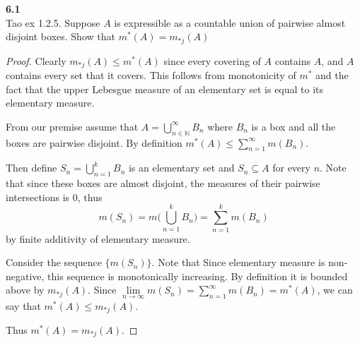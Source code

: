 \documentclass[12pt]{article}
\newcommand{\problem}[1]{\hspace{-4 ex} \large \textbf{#1}\\}
\begin{document}
\problem{6.1}Tao ex 1.2.5. Suppose $A$ is expressible as a countable union of pairwise almost disjoint boxes. Show that $m^*(A)=m_{*j}(A)$ 
	\begin{proof}
		Clearly $m_{*j}(A) \leq m^*(A)$ since every covering of $A$ contains $A$, and $A$ contains every set that it covers. This follows from monotonicity of $m^*$ and the fact that the upper Lebesgue measure of an elementary set is equal to its elementary measure. \bigbreak
		
		From our premise assume that $A = \bigcup\limits_{n \in \mathbb{N}}^\infty B_n$ where $B_n$ is a box and all the boxes are pairwise disjoint. By definition $m^*(A) \leq \sum\limits_{n=1}^\infty m(B_n)$. \bigbreak
		
		Then define $S_n = \bigcup\limits_{n=1}^k B_n$ is an elementary set and $S_n \subseteq A$ for every $n$. Note that since these boxes are almost disjoint, the measures of their pairwise intersections is $0$, thus 
		$$m(S_n) = m\Big(\bigcup\limits_{n=1}^k B_n \Big) = \sum\limits_{n=1}^k m(B_n)$$
		by finite additivity of elementary measure.
		
		Consider the sequence $\{m(S_n)\}$. Note that Since elementary measure is non-negative, this sequence is monotonically increasing. By definition it is bounded above by  $m_{*j}(A)$. Since $\lim\limits_{n \to \infty} m(S_n) = \sum\limits_{n=1}^\infty m(B_n) = m^*(A)$, we can say that $m^*(A) \leq m_{*j}(A)$. \bigbreak
		
		Thus $m^*(A)=m_{*j}(A)$.		
	\end{proof}
\end{document}
